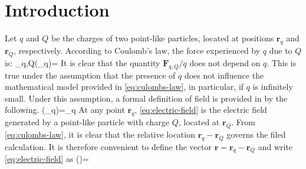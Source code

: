 \section{Introduction}
Let $q$ and $Q$ be the charges of two point-like particles, located at positions $\mathbf{r}_{q}$ and $\mathbf{r}_{Q}$, respectively.
According to Coulomb's law, the force experienced by $q$ due to $Q$ is:
\be\label{eq:culombs-law}
_{q,Q}(_q)=
\ee
It is clear that the quantity $\mathbf{F}_{q,Q}/q$ does not depend on $q$. This is true under the assumption that the presence of $q$ does not influence the mathematical model provided in \ref{eq:culombs-law}, in particular, if $q$ is infinitely small. Under this assumption, a formal definition of field is provided in by the following.
\be\label{eq:electric-field}
(_{q})=\lim_{q } 
\ee
At any point $\mathbf{r}_{q}$, \ref{eq:electric-field} is the electric field generated by a point-like particle with charge $Q$, located at $\mathbf{r}_{Q}$. From \ref{eq:culombs-law}, it is clear that the relative location $\mathbf{r}_{q}-\mathbf{r}_{Q}$ governs the filed calculation. It is therefore convenient to define the vector $\mathbf{r}=\mathbf{r}_{q}-\mathbf{r}_{Q}$ and write \ref{eq:electric-field} as 
\be\label{eq:electric-field-final}
()=
\ee